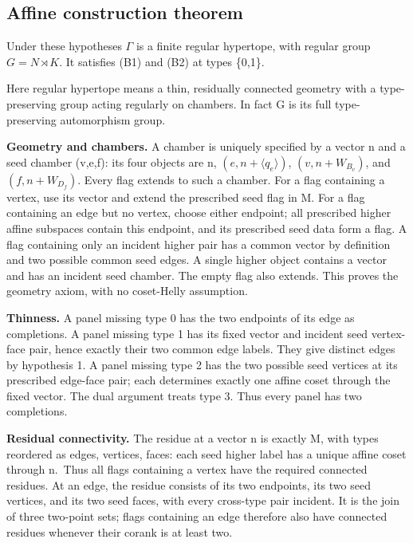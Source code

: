 \subsection{Affine construction
theorem}\label{affine-construction-theorem}

Under these hypotheses \(\Gamma\) is a finite regular hypertope, with
regular group \(G=N\rtimes K\). It satisfies (B1) and (B2) at types
\{0,1\}.

Here regular hypertope means a thin, residually connected geometry with
a type-preserving group acting regularly on chambers. In fact G is its
full type-preserving automorphism group.

\textbf{Geometry and chambers.} A chamber is uniquely specified by a
vector n and a seed chamber (v,e,f): its four objects are n,
\((e,n+\langle q_e\rangle)\), \((v,n+W_{B_v})\), and \((f,n+W_{D_f})\).
Every flag extends to such a chamber. For a flag containing a vertex,
use its vector and extend the prescribed seed flag in M. For a flag
containing an edge but no vertex, choose either endpoint; all prescribed
higher affine subspaces contain this endpoint, and its prescribed seed
data form a flag. A flag containing only an incident higher pair has a
common vector by definition and two possible common seed edges. A single
higher object contains a vector and has an incident seed chamber. The
empty flag also extends. This proves the geometry axiom, with no
coset-Helly assumption.

\textbf{Thinness.} A panel missing type 0 has the two endpoints of its
edge as completions. A panel missing type 1 has its fixed vector and
incident seed vertex-face pair, hence exactly their two common edge
labels. They give distinct edges by hypothesis 1. A panel missing type 2
has the two possible seed vertices at its prescribed edge-face pair;
each determines exactly one affine coset through the fixed vector. The
dual argument treats type 3. Thus every panel has two completions.

\textbf{Residual connectivity.} The residue at a vector n is exactly M,
with types reordered as edges, vertices, faces: each seed higher label
has a unique affine coset through n.~Thus all flags containing a vertex
have the required connected residues. At an edge, the residue consists
of its two endpoints, its two seed vertices, and its two seed faces,
with every cross-type pair incident. It is the join of three two-point
sets; flags containing an edge therefore also have connected residues
whenever their corank is at least two.

